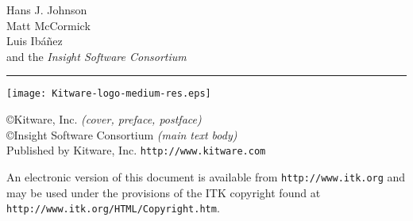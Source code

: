 \hfill
\begin{minipage}[t][6cm][b]{0.6\textwidth}
\Large
\renewcommand{\baselinestretch}{1.5}
Hans J. Johnson\\
Matt McCormick \\
Luis Ib\'{a}\~{n}ez\\
and the \emph{Insight Software Consortium}
\normalsize
\end{minipage}


\begin{minipage}[t][2cm][b]{\textwidth}
\rule{14cm}{1pt}
\end{minipage}

\newpage

\begin{minipage}[t][4cm][b]{\textwidth}
\begin{center}
\texttt{[image: Kitware-logo-medium-res.eps]}
\end{center}
\par
\begin{center}
\large

\copyright \the\year Kitware, Inc. \emph{(cover, preface, postface)}\\
\copyright \the\year Insight Software Consortium \emph{(main text body)}\\
Published by Kitware, Inc. \texttt{http://www.kitware.com}
\normalsize
\end{center}
\end{minipage}


\begin{minipage}[t][2.25cm][b]{\textwidth}
\begin{center}
An electronic version of this document is available from
\texttt{http://www.itk.org} and may be used under the provisions of the
ITK copyright found at \texttt{http://www.itk.org/HTML/Copyright.htm}.
\end{center}
\end{minipage}




